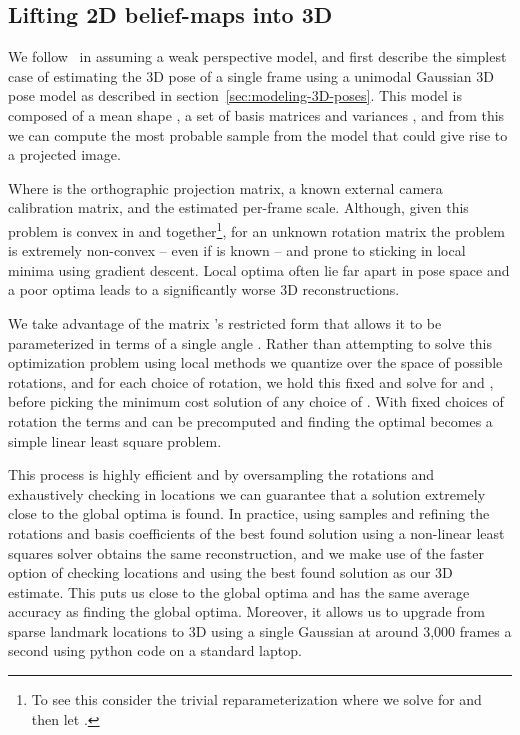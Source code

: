 \documentclass[10pt,twocolumn,letterpaper]{article}
\begin{document}
\subsection{Lifting 2D belief-maps into 3D}
\label{sec:recovering-3D-from}\vspace{-2mm}
We follow~\cite{zhou2015sparseness} in assuming a weak perspective model, and
first describe the simplest case of estimating the 3D pose of a single frame
using a unimodal Gaussian 3D pose model as described in
section~\ref{sec:modeling-3D-poses}. This model is composed of a mean shape
, a set of basis matrices  and variances , and from this
we can compute the most probable sample from the model that could give rise to a
projected image.

Where  is the orthographic projection matrix,  a
known external camera calibration matrix, and  the estimated
per-frame scale. Although, given  this problem is convex in  and
 together\footnote{To see this consider the trivial
  reparameterization where we solve for  and
  then let .}, for an unknown rotation matrix  the problem
is extremely non-convex -- even if  is known -- and prone to
sticking in local minima using gradient
descent. Local optima often lie far apart in pose space and
 a poor optima leads to a significantly worse 3D
reconstructions.

We take advantage of the matrix 's restricted form that allows it
to be parameterized in terms of a single angle . Rather than attempting to solve this optimization
problem using local  methods we quantize over the space
of possible rotations, and for each choice of rotation, we hold this
fixed and solve for  and , before picking the minimum cost
solution of any choice of . With fixed choices of rotation the
terms  and  can be precomputed and
finding the optimal  becomes a simple linear least square problem.

This process is highly efficient and by oversampling the rotations
and exhaustively checking in  locations we can guarantee that
a solution extremely close to the global optima is found. In
practice, using  samples and refining the rotations and basis
coefficients of the best found solution using a non-linear least
squares solver obtains the same reconstruction, and we make use of the
faster option of checking  locations and using the best found
solution as our 3D estimate. This puts us close to the global optima
and has the same average accuracy as finding the global
optima. Moreover, it allows us to upgrade from sparse landmark locations
to 3D using a single Gaussian at around 3,000 frames a second using
python code on a standard laptop.
\end{document}
